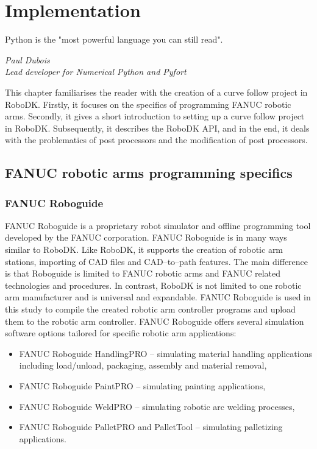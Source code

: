 \chapter{Implementation \label{chap:implementation}}



\epigraph{Python is the "most powerful language you can still read".}{\textit{Paul Dubois \\ Lead developer for Numerical Python and Pyfort }}

This chapter familiarises the reader with the creation of a curve follow project in RoboDK. Firstly, it focuses on the specifics of programming FANUC robotic arms. Secondly, it gives a short introduction to setting up a curve follow project in RoboDK. Subsequently, it describes the RoboDK API, and in the end, it deals with the problematics of post processors and the modification of post processors.

\section{FANUC robotic arms programming specifics}

\subsection{FANUC Roboguide}

FANUC Roboguide is a proprietary robot simulator and offline programming tool developed by the FANUC corporation. FANUC Roboguide is in many ways similar to RoboDK.  Like RoboDK, it supports the creation of robotic arm stations, importing of CAD files and CAD--to--path features. The main difference is that Roboguide is limited to FANUC robotic arms and FANUC related technologies and procedures. In contrast, RoboDK is not limited to one robotic arm manufacturer and is universal and expandable. FANUC Roboguide is used in this study to compile the created robotic arm controller programs and upload them to the robotic arm controller. FANUC Roboguide offers several simulation software options tailored for specific robotic arm applications:

\begin{itemize}

\item FANUC Roboguide HandlingPRO -- simulating material handling applications including load/unload, packaging, assembly and material removal,
\item FANUC Roboguide PaintPRO -- simulating painting applications,
\item FANUC Roboguide WeldPRO -- simulating robotic arc welding processes,
\item FANUC Roboguide PalletPRO and PalletTool -- simulating palletizing applications.

\end{itemize}

